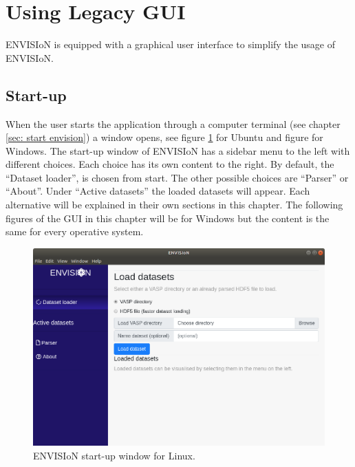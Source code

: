 \section{Using Legacy GUI}
\label{sec:GUI}
ENVISIoN is equipped with a graphical user interface to simplify the usage of ENVISIoN. 

\subsection{Start-up}
When the user starts the application through a computer terminal (see chapter \ref{sec: start envision}) a window opens, see figure \ref{fig:GUIStartupUbuntu} for Ubuntu and figure for Windows. The start-up window of ENVISIoN has a sidebar menu to the left with different choices. Each choice has its own content to the right. By default, the ``Dataset loader'', is chosen from start. The other possible choices are ``Parser'' or ``About''. Under ``Active datasets'' the loaded datasets will appear. Each alternative will be explained in their own sections in this chapter. The following figures of the GUI in this chapter will be for Windows but the content is the same for every operative system.

\begin{figure}[H]
    \centering
    \includegraphics[scale = 0.3]{Images/GUI_start_Ubuntu.png}
    \caption{ENVISIoN start-up window for Linux.}
    \label{fig:GUIStartupUbuntu}
\end{figure}

